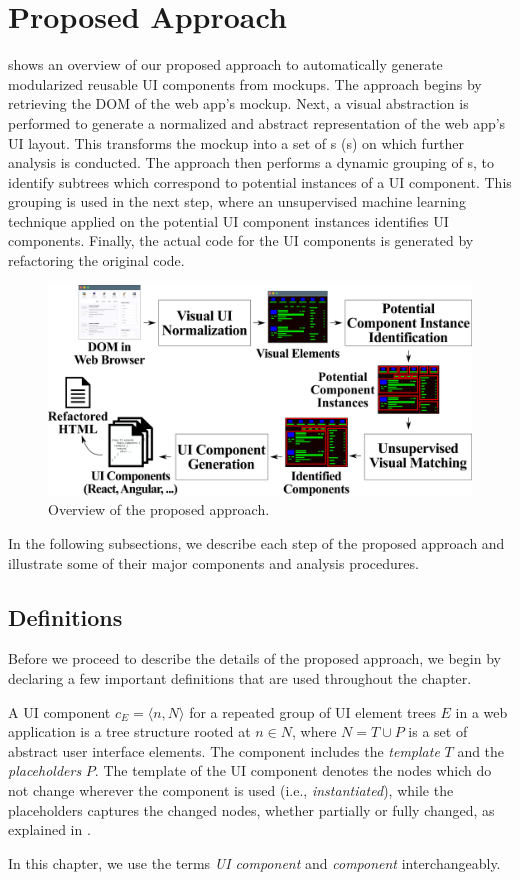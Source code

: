 

\section{Proposed Approach}
\label{section:approach}


 shows an overview of our proposed approach
to automatically generate modularized reusable UI components
from mockups.
The approach begins by retrieving the DOM of the web app's mockup. 
Next, a visual abstraction is performed to generate a normalized and abstract representation of the web app's UI layout.
This transforms the mockup into a set of {\VizElem}s ({\VE}s) on which further analysis is conducted. 
The approach then performs a dynamic grouping  of {\VizElem}s,
to identify subtrees
which correspond to potential instances of a UI component. 
This grouping is used in the next step, where an unsupervised machine learning technique applied on the 
potential UI component instances identifies UI components.
Finally, the actual code for the UI components is generated by refactoring the original \html code.

\begin{figure}
    \centering
    \includegraphics[width=0.75\linewidth]{maintainability/figures/approach-diagram}
    \caption{Overview of the proposed approach.} 
    \label{fig:approach-diagram}
\end{figure} 


In the following subsections, we describe each step of the proposed approach and illustrate some of their major components and analysis procedures. 

\subsection{Definitions}
Before we proceed to describe the details of the proposed approach, we begin by declaring a few important definitions that are used throughout the chapter.
\begin{defn}
A UI component $c_E=\langle n, N \rangle$ 
for a repeated group of UI element trees $E$ in a web application
is a tree structure rooted at $n \in N$, where $N= T \cup P$ is a set of abstract user interface elements.
The component includes the \emph{template} $T$ and the \emph{placeholders} $P$.
The template of the UI component denotes the nodes which do not change wherever the component is used (i.e., \emph{instantiated}),
while the placeholders captures the changed nodes, whether partially or fully changed, as explained in .
\end{defn} 
In this chapter, we use the terms \textit{UI component} and \textit{component} interchangeably.


